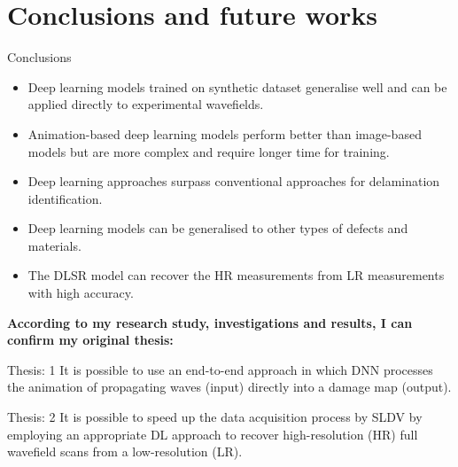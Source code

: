 \documentclass[10pt,aspectratio=169,dvipsnames]{beamer} %
\begin{document}
	\section{Conclusions and future works}
	\begin{frame}{Conclusions}		
		\begin{footnotesize}
				\begin{itemize}
					\item Deep learning models trained on synthetic dataset generalise well and can be applied directly to experimental wavefields.				
					\item Animation-based deep learning models perform better than image-based models but are more complex and require longer time for training.
					\item Deep learning approaches surpass conventional approaches for delamination identification.
					\item Deep learning models can be generalised to other types of defects and materials.
					\item The DLSR model can recover the HR measurements from LR measurements with high accuracy.
				\end{itemize}
		\begin{tcolorbox}
			\textbf{According to my research study, investigations and results, I can confirm my original thesis:}
			\begin{alertblock}{Thesis: 1}
				It is possible to use an end-to-end approach in which DNN 
				processes the animation of propagating waves (input) directly into a damage map (output).
			\end{alertblock}
			\begin{alertblock}{Thesis: 2}
				It is possible to speed up the data acquisition process by SLDV by employing an appropriate DL approach to recover high-resolution (HR) full wavefield scans  from a low-resolution (LR).
			\end{alertblock}
		\end{tcolorbox}				
		\end{footnotesize}			
	\end{frame}		
\end{document}
